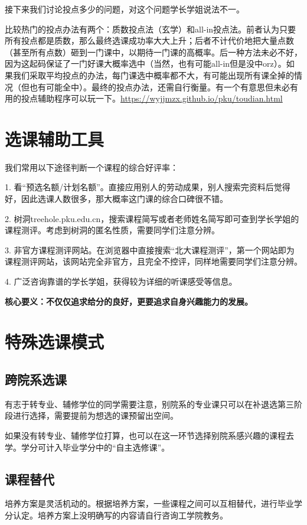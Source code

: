 \documentclass[11pt,oneside]{book}
\begin{document}
接下来我们讨论投点多少的问题，对这个问题学长学姐说法不一。

比较热门的投点办法有两个：质数投点法（玄学）和all-in投点法。前者认为只要所有投点都是质数，那么最终选课成功率大大上升；后者不计代价地把大量点数（甚至所有点数）砸到一门课中，以期待一门课的高概率。后一种方法未必不好，因为这起码保证了一门好课大概率选中（当然，也有可能all-in但是没中orz）。如果我们采取平均投点的办法，每门课选中概率都不大，有可能出现所有课全掉的情况（但也有可能全中）。最终的投点办法，还需自行衡量。有一个有意思但未必有用的投点辅助程序可以玩一下。\href{https://wyjjmzx.github.io/pku/toudian.html}{https://wyjjmzx.github.io/pku/toudian.html}


\section{选课辅助工具}
我们常用以下途径判断一个课程的综合好评率：

1. 看“预选名额/计划名额”。直接应用别人的劳动成果，别人搜索完资料后觉得好，因此选课人数很多，那大概率这门课的综合口碑很不错。

2. 树洞treehole.pku.edu.cn，搜索课程简写或者老师姓名简写即可查到学长学姐的课程测评。考虑到树洞的匿名性质，需要同学们注意分辨。

3. 非官方课程测评网站。在浏览器中直接搜索“北大课程测评”，第一个网站即为课程测评网站，该网站完全非官方，且完全不控评，同样地需要同学们注意分辨。

4. 广泛咨询靠谱的学长学姐，获得较为详细的听课感受等信息。

\textbf{核心要义：不仅仅追求给分的良好，更要追求自身兴趣能力的发展。}

\section{特殊选课模式}
\subsection{跨院系选课}
有志于转专业、辅修学位的同学需要注意，别院系的专业课只可以在补退选第三阶段进行选择，需要提前为想选的课预留出空间。

如果没有转专业、辅修学位打算，也可以在这一环节选择别院系感兴趣的课程去学。学分可计入毕业学分中的“自主选修课”。

\subsection{课程替代}
培养方案是灵活机动的。根据培养方案，一些课程之间可以互相替代，进行毕业学分认定。培养方案上没明确写的内容请自行咨询工学院教务。
\end{document}
